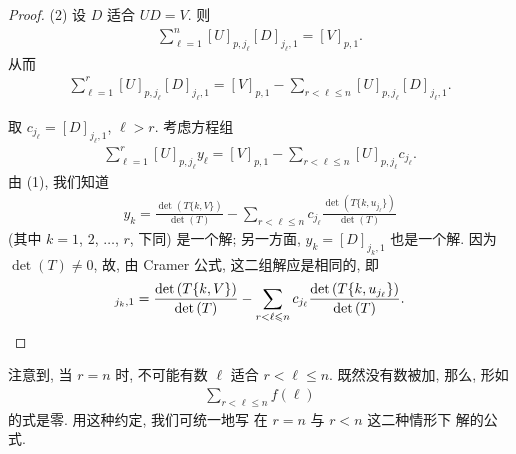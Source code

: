 \begin{proof}
    (2)
    设 \(D\) 适合 \(UD = V\).
    则
    \begin{align*}
        \sum_{\ell = 1}^{n}
        {[U]_{p,j_\ell} [D]_{j_\ell,1}}
            = [V]_{p,1}.
    \end{align*}
    从而
    \begin{align*}
        \sum_{\ell = 1}^{r}
        {[U]_{p,j_\ell} [D]_{j_\ell,1}}
            = [V]_{p,1}
        - \sum_{r < \ell \leq n}
        {[U]_{p,j_\ell} [D]_{j_\ell,1}}.
    \end{align*}

    取 \(c_{j_\ell} = [D]_{j_\ell,1}\),
    \(\ell > r\).
    考虑方程组
    \begin{align*}
        \sum_{\ell = 1}^{r}
        {[U]_{p,j_\ell} y_\ell}
        = [V]_{p,1}
        - \sum_{r < \ell \leq n}
        {[U]_{p,j_\ell} c_{j_\ell}}.
    \end{align*}
    由 (1), 我们知道
    \begin{align*}
        y_k =
        \frac{\det {(T\{k,V\})}}{\det {(T)}}
        - \sum_{r < \ell \leq n}
        {c_{j_\ell}
        \frac{\det {(T\{k,u_{j_\ell}\})}}{\det {(T)}}}
    \end{align*}
    (其中 \(k = 1\), \(2\), \(\dots\), \(r\), 下同)
    是一个解;
    另一方面,
    \(y_k = [D]_{j_k,1}\) 也是一个解.
    因为 \(\det {(T)} \neq 0\),
    故, 由 Cramer 公式,
    这二组解应是相同的,
    即
    \begin{equation*}
        [D]_{j_k,1} =
        \frac{\det {(T\{k,V\})}}{\det {(T)}}
        - \sum_{r < \ell \leq n}
        {c_{j_\ell}
        \frac{\det {(T\{k,u_{j_\ell}\})}}{\det {(T)}}}.
        \qedhere
    \end{equation*}
\end{proof}


注意到, 当 \(r = n\) 时,
不可能有数 \(\ell\) 适合 \(r < \ell \leq n\).
既然没有数被加, 那么, 形如
\begin{align*}
    \sum_{r < \ell \leq n} {f(\ell)}
\end{align*}
的式是零.
用这种约定,
我们可统一地写%
在 \(r = n\) 与 \(r < n\) 这二种情形下%
解的公式.

